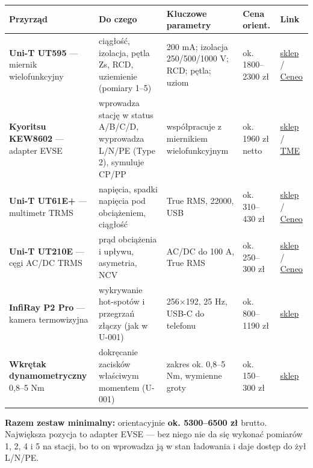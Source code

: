 \documentclass[11pt]{article}
\newcommand{\key}[1]{\textbf{\color{navy}#1}}
\begin{document}
\vspace{2pt}\footnotesize
\begin{tabularx}{\linewidth}{@{}p{3.15cm} Y p{3.0cm} p{1.9cm} p{1.25cm}@{}}
\toprule
\textbf{Przyrząd} & \textbf{Do czego} & \textbf{Kluczowe parametry} & \textbf{Cena orient.} & \textbf{Link} \\
\midrule
\key{Uni-T UT595} — miernik wielofunkcyjny & ciągłość, izolacja, pętla Zs, RCD, uziemienie (pomiary 1–5) & 200 mA; izolacja 250/500/1000 V; RCD; pętla; uziom & ok. 1800–2300 zł & \href{https://centrummiernictwa.pl/produkt/ut595-wielofunkcyjny-miernik-instalacji-uni-t/}{sklep} / \href{https://www.ceneo.pl/35724086}{Ceneo} \\
\addlinespace
\key{Kyoritsu KEW8602} — adapter EVSE & wprowadza stację w status A/B/C/D, wyprowadza L/N/PE (Type 2), symuluje CP/PP & współpracuje z miernikiem wielofunkcyjnym & ok. 1960 zł netto & \href{https://www.elektryknet.pl/produkt/kew8602-evse-adapter-do-testowania-stacji-ladowania-pojazdow-elektrycznych}{sklep} / \href{https://www.tme.eu/en/details/kew8602/pv-and-evse-testers-and-meters/kyoritsu/}{TME} \\
\addlinespace
\key{Uni-T UT61E+} — multimetr TRMS & napięcia, spadki napięcia pod obciążeniem, ciągłość & True RMS, 22000, USB & ok. 310–430 zł & \href{https://termoplus.pl/ut61e-plus.html}{sklep} / \href{https://www.ceneo.pl/157180044}{Ceneo} \\
\addlinespace
\key{Uni-T UT210E} — cęgi AC/DC TRMS & prąd obciążenia i upływu, asymetria, NCV & AC/DC do 100 A, True RMS & ok. 250–300 zł & \href{https://termoplus.pl/ut210e.html}{sklep} / \href{https://www.ceneo.pl/75262019}{Ceneo} \\
\addlinespace
\key{InfiRay P2 Pro} — kamera termowizyjna & wykrywanie hot-spotów i przegrzań złączy (jak w U-001) & 256×192, 25 Hz, USB-C do telefonu & ok. 800–1190 zł & \href{https://snapdiag.pl/product/kamera-termowizyjna-na-podczerwien-usb-c-infiray-p2-pro-makro-256x152-25hz-pirometr/}{sklep} \\
\addlinespace
\key{Wkrętak dynamometryczny} 0,8–5 Nm & dokręcanie zacisków właściwym momentem (U-001) & zakres ok. 0,8–5 Nm, wymienne groty & ok. 150–300 zł & \href{https://dynamometryczne.pl/wkretaki-c4}{sklep} \\
\bottomrule
\end{tabularx}
\normalsize

\vspace{3pt}
\key{Razem zestaw minimalny:} orientacyjnie \key{ok. 5300–6500 zł} brutto. Największa pozycja to adapter EVSE — bez niego nie da się wykonać pomiarów 1, 2, 4 i 5 na stacji, bo to on wprowadza ją w stan ładowania i daje dostęp do żył L/N/PE.
\end{document}
